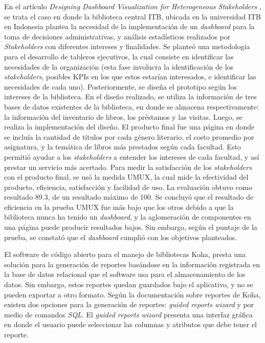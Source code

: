 \documentclass[spanish]{ieee_upb}
\begin{document}


En el artículo \textit{Designing Dashboard Visualization for
Heterogeneous Stakeholders} \cite{DashboardHeterogeneous}, se trata el caso en donde la biblioteca central ITB, ubicada en la universidad ITB en Indonesia plantea la necesidad de la implementación de un \textit{dashboard} para la toma de decisiones administrativas, y análisis estadísticos realizados por \textit{Stakeholders} con diferentes intereses y finalidades\cite{MeaningHeterogeneousStakeholders}. Se planteó una metodología para el desarrollo de tableros ejecutivos, la cual consiste en identificar las necesidades de la organización (esta fase involucra la identificación de los \textit{stakeholders}, posibles KPIs en los que estos estarían interesados, e identificar las necesidades de cada uno). Posteriormente, se diseña el prototipo según los intereses de la biblioteca. En el diseño realizado, se utiliza la información de tres bases de datos existentes de la biblioteca, en donde se almacena respectivamente: la información del inventario de libros, los préstamos y las visitas. Luego, se realiza la implementación del diseño. El producto final fue una página en donde se incluía la cantidad de títulos por cada género literario, el costo promedio por asignatura, y la temática de libros más prestados según cada facultad.
Esto permitió ayudar a los \textit{stakeholders} a entender los intereses de cada facultad, y así prestar un servicio más acertado\cite{DashboardHeterogeneous}.
Para medir la satisfacción de los \textit{stakeholders} con el producto final, se usó la medida UMUX, la cual mide la efectividad del producto, eficiencia, satisfacción y facilidad de uso. La evaluación obtuvo como resultado 89.3, de un resultado máximo de 100. Se concluyó que el resultado de eficiencia en la prueba UMUX fue más bajo que los otros debido a que la biblioteca nunca ha tenido un \textit{dashboard}, y la aglomeración de componentes en una página puede producir resultados bajos. Sin embargo, según el puntaje de la prueba, se constató que el  \textit{dashboard} cumplió con los objetivos planteados.\cite{DashboardHeterogeneous}

El software de código abierto para el manejo de bibliotecas Koha\cite{KOHA}, presta una solución para la generación de reportes basándose en la información registrada en la base de datos relacional que el software usa para el almacenamiento de los datos\cite{koha_manual_custom_reports}. Sin embargo, estos reportes quedan guardados bajo el aplicativo, y no se pueden exportar a otro formato. Según la documentación sobre reportes de Koha\cite{koha_manual_custom_reports}, existen dos opciones para la generación de reportes: \textit{guided reports wizard} y por medio de comandos \textit{SQL}. El \textit{guided reports wizard} presenta una interfaz gráfica en donde el usuario puede seleccionar las columnas y atributos que debe tener el reporte.
\end{document}
